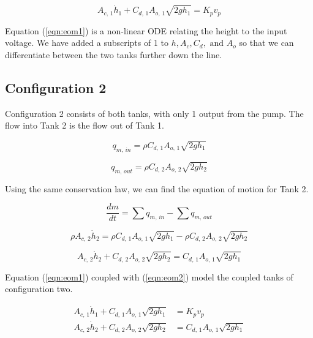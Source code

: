 \documentclass[12pt]{article}
\numberwithin{equation}{subsection}
\begin{document}
  \begin{equation} \label{eqn:eom1}
    A_{c, \, 1} \dot h_1 +  C_{d, \, 1} A_{o, \, 1} \sqrt{2gh_1} = K_p v_p
  \end{equation}

  Equation (\ref{eqn:eom1}) is a non-linear ODE relating the height to the input voltage. We have added a subscripts of 1 to $ h, A_c, C_d, \text{ and } A_o $ so that we can differentiate between the two tanks further down the line.

  \subsection{Configuration 2}

  Configuration 2 consists of both tanks, with only 1 output from the pump. The flow into Tank 2 is the flow out of Tank 1.

  \begin{equation}
    q_{m, \, in} = \rho C_{d, \, 1} A_{o, \, 1}  \sqrt{2gh_1}
  \end{equation}

  \begin{equation}
    q_{m, \, out} = \rho C_{d, \, 2} A_{o, \, 2}  \sqrt{2gh_2}
  \end{equation}

  Using the same conservation law, we can find the equation of motion for Tank 2.

  \begin{equation}
    \frac{dm}{dt} = \sum q_{m, \, in} - \sum q_{m ,\, out}
  \end{equation}

  \begin{equation}
    \rho A_{c, \, 2} \dot h_2 = \rho C_{d, \, 1} A_{o, \, 1}  \sqrt{2gh_1} - \rho C_{d, \, 2} A_{o, \, 2}  \sqrt{2gh_2}
  \end{equation}

  \begin{equation} \label{eqn:eom2}
    A_{c, \, 2} \dot h_2 + C_{d, \, 2} A_{o, \, 2}  \sqrt{2gh_2} = C_{d, \, 1} A_{o, \, 1}  \sqrt{2gh_1}
  \end{equation}

  Equation (\ref{eqn:eom1}) coupled with (\ref{eqn:eom2}) model the coupled tanks of configuration two.

  \begin{equation}
    \begin{aligned}
      A_{c, \, 1} \dot h_1 +  C_{d, \, 1} A_{o, \, 1} \sqrt{2gh_1} &= K_p v_p \\
      A_{c, \, 2} \dot h_2 + C_{d, \, 2} A_{o, \, 2}  \sqrt{2gh_2} &= C_{d, \, 1} A_{o, \, 1}  \sqrt{2gh_1}
    \end{aligned}
  \end{equation}
\end{document}
